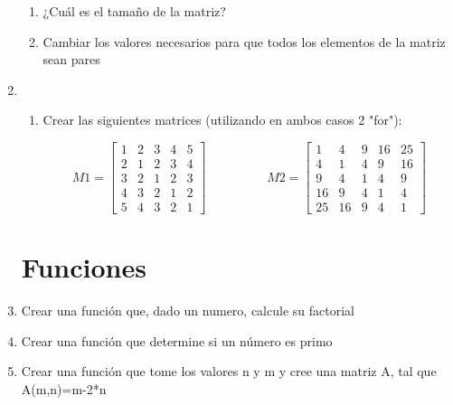 \documentclass[a4paper, 11pt]{article}
\begin{document}
\begin{enumerate}[font=\large\bfseries]
\begin{enumerate}
    
    \item ¿Cuál es el tamaño de la matriz?
    \item Cambiar los valores necesarios para que todos los elementos de la matriz sean pares
    \end{enumerate}
    \item
    \begin{enumerate}
        \item Crear las siguientes matrices (utilizando en ambos casos 2 "for"):
        
                \[
                M1=
                  \begin{bmatrix}
                    1 & 2 & 3 & 4 & 5 \\
                    2 & 1 & 2 & 3 & 4 \\
                    3 & 2 & 1 & 2 & 3 \\
                    4 & 3 & 2 & 1 & 2 \\
                    5 & 4 & 3 & 2 & 1
                  \end{bmatrix}
                \hspace{2cm} M2=\begin{bmatrix}
                    1 & 4 & 9 & 16 & 25 \\
                    4 & 1 & 4 & 9 & 16 \\
                    9 & 4 & 1 & 4 & 9 \\
                    16 & 9 & 4 & 1 & 4 \\
                    25 & 16 & 9 & 4 & 1
                  \end{bmatrix}
                \]
    \end{enumerate}
    
    
\section*{Funciones}

\item Crear una función que, dado un numero, calcule su factorial
\item Crear una función que determine si un número es primo
\item Crear una función que tome los valores n y m y cree una matriz A, tal que A(m,n)=m-2*n


\end{enumerate}
\end{document}
